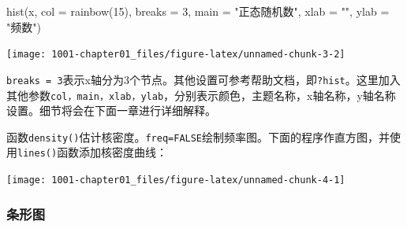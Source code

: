 \documentclass[
]{book}
\newenvironment{Shaded}{\begin{snugshade}}{\end{snugshade}}
\newcommand{\AttributeTok}[1]{\textcolor[rgb]{0.77,0.63,0.00}{#1}}
\newcommand{\ConstantTok}[1]{\textcolor[rgb]{0.00,0.00,0.00}{#1}}
\newcommand{\DecValTok}[1]{\textcolor[rgb]{0.00,0.00,0.81}{#1}}
\newcommand{\FloatTok}[1]{\textcolor[rgb]{0.00,0.00,0.81}{#1}}
\newcommand{\FunctionTok}[1]{\textcolor[rgb]{0.00,0.00,0.00}{#1}}
\newcommand{\NormalTok}[1]{#1}
\newcommand{\OtherTok}[1]{\textcolor[rgb]{0.56,0.35,0.01}{#1}}
\newcommand{\SpecialCharTok}[1]{\textcolor[rgb]{0.00,0.00,0.00}{#1}}
\newcommand{\StringTok}[1]{\textcolor[rgb]{0.31,0.60,0.02}{#1}}
\begin{document}
\begin{Shaded}
\begin{Highlighting}[]
\FunctionTok{hist}\NormalTok{(x, }\AttributeTok{col =} \FunctionTok{rainbow}\NormalTok{(}\DecValTok{15}\NormalTok{), }\AttributeTok{breaks =} \DecValTok{3}\NormalTok{, }\AttributeTok{main =} \StringTok{"正态随机数"}\NormalTok{, }\AttributeTok{xlab =} \StringTok{""}\NormalTok{, }\AttributeTok{ylab =} \StringTok{"频数"}\NormalTok{)}
\end{Highlighting}
\end{Shaded}

\begin{center}\texttt{[image: 1001-chapter01\_files/figure-latex/unnamed-chunk-3-2]} \end{center}

\texttt{breaks\ =\ 3}表示x轴分为3个节点。其他设置可参考帮助文档，即\texttt{?hist}。这里加入其他参数\texttt{col，main，xlab，ylab}，分别表示颜色，主题名称，x轴名称，y轴名称设置。细节将会在下面一章进行详细解释。

函数\texttt{density()}估计核密度。\texttt{freq=FALSE}绘制频率图。下面的程序作直方图，并使用\texttt{lines()}函数添加核密度曲线：

\begin{Shaded}
\end{Shaded}

\begin{center}\texttt{[image: 1001-chapter01\_files/figure-latex/unnamed-chunk-4-1]} \end{center}

\hypertarget{ux6761ux5f62ux56fe}{%
\subsubsection{条形图}\label{ux6761ux5f62ux56fe}}
\end{document}
